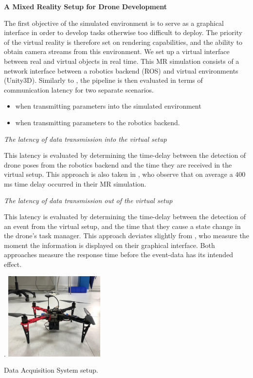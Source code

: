 \textbf{A Mixed Reality Setup for Drone Development}

The first objective of the simulated environment is to serve as a graphical interface in order to develop tasks otherwise too difficult to deploy. The priority of the virtual reality is therefore set on rendering capabilities, and the ability to obtain camera streams from this environment. 
We set up a virtual interface between real and virtual objects in real time. This MR simulation consists of a network interface between a robotics backend (ROS) and virtual environments (Unity3D). Similarly to \cite{mr_planetary}, the pipeline is then evaluated in terms of communication latency for two separate scenarios.
\begin{itemize}
    \item when transmitting parameters into the simulated environment
    \item when transmitting parameters to the robotics backend.
\end{itemize}

\textit{The latency of data transmission into the virtual setup}

This latency is evaluated by determining the time-delay between the detection of drone poses from the robotics backend and the time they are received in the virtual setup. This approach is also taken in \cite{mr_planetary}, who observe that on average a 400 ms time delay occurred in their MR simulation.

\textit{The latency of data transmission out of the virtual setup}

This latency is evaluated by determining the time-delay between the detection of an event from the virtual setup, and the time that they cause a state change in the drone’s task manager. This approach deviates slightly from \cite{mr_planetary}, who measure the moment the information is displayed on their graphical interface. Both approaches measure the response time before the event-data has its intended effect.

\textit{\textbf{}}


\begin{marginfigure}%
    \raggedright. 
    \includegraphics[width=5cm]{images/stage_system/drone_setup.png}
    \caption{Data Acquisition System setup. }
    \label{fig:damping_intro} 
\end{marginfigure}    


